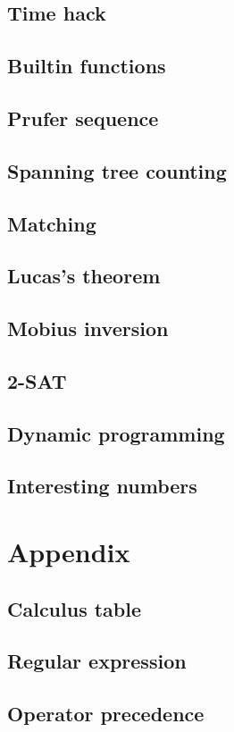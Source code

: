 \documentclass[titlepage, a4paper,10pt]{article}
\begin{document}
\begin{multicols}{2}
\begin{spacing}{0.6}
{			\subsection{Time hack}
				
			\subsection{Builtin functions}
				
			\subsection{Prufer sequence}
				
			\subsection{Spanning tree counting}
				
			\subsection{Matching}
				
			\subsection{Lucas's theorem}
				
			\subsection{Mobius inversion}
				
			\subsection{2-SAT}
				
			\subsection{Dynamic programming}
				
			\subsection{Interesting numbers}
				
		\section{Appendix}
			\subsection{Calculus table}
				
				
			\subsection{Regular expression}
				
			\subsection{Operator precedence}
				
		}
		\end{spacing}
		\endgroup
	\end{multicols}
\end{document}

